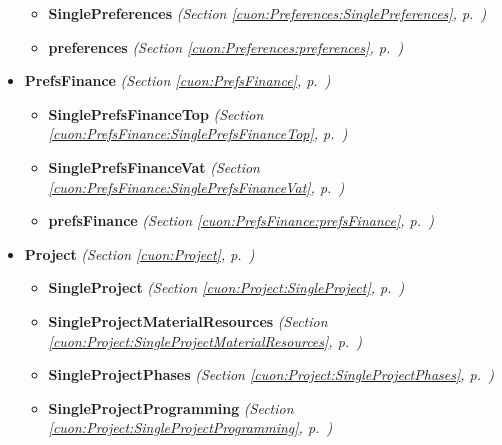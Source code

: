 \begin{itemize}
  \begin{itemize}
\setlength{\parskip}{0ex}
    \item \textbf{SinglePreferences}
  \textit{(Section \ref{cuon:Preferences:SinglePreferences}, p.~\pageref{cuon:Preferences:SinglePreferences})}

    \item \textbf{preferences}
  \textit{(Section \ref{cuon:Preferences:preferences}, p.~\pageref{cuon:Preferences:preferences})}

  \end{itemize}
\item \textbf{PrefsFinance}
  \textit{(Section \ref{cuon:PrefsFinance}, p.~\pageref{cuon:PrefsFinance})}

  \begin{itemize}
\setlength{\parskip}{0ex}
    \item \textbf{SinglePrefsFinanceTop}
  \textit{(Section \ref{cuon:PrefsFinance:SinglePrefsFinanceTop}, p.~\pageref{cuon:PrefsFinance:SinglePrefsFinanceTop})}

    \item \textbf{SinglePrefsFinanceVat}
  \textit{(Section \ref{cuon:PrefsFinance:SinglePrefsFinanceVat}, p.~\pageref{cuon:PrefsFinance:SinglePrefsFinanceVat})}

    \item \textbf{prefsFinance}
  \textit{(Section \ref{cuon:PrefsFinance:prefsFinance}, p.~\pageref{cuon:PrefsFinance:prefsFinance})}

  \end{itemize}
\item \textbf{Project}
  \textit{(Section \ref{cuon:Project}, p.~\pageref{cuon:Project})}

  \begin{itemize}
\setlength{\parskip}{0ex}
    \item \textbf{SingleProject}
  \textit{(Section \ref{cuon:Project:SingleProject}, p.~\pageref{cuon:Project:SingleProject})}

    \item \textbf{SingleProjectMaterialResources}
  \textit{(Section \ref{cuon:Project:SingleProjectMaterialResources}, p.~\pageref{cuon:Project:SingleProjectMaterialResources})}

    \item \textbf{SingleProjectPhases}
  \textit{(Section \ref{cuon:Project:SingleProjectPhases}, p.~\pageref{cuon:Project:SingleProjectPhases})}

    \item \textbf{SingleProjectProgramming}
  \textit{(Section \ref{cuon:Project:SingleProjectProgramming}, p.~\pageref{cuon:Project:SingleProjectProgramming})}


\end{itemize}
\end{itemize}

